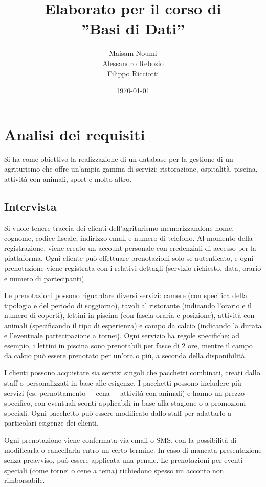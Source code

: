 \documentclass[a4paper,11pt]{report}
\title{Elaborato per il corso di\\''Basi di Dati''}
\author{
    Maisam Noumi\\
    Alessandro Rebosio\\
    Filippo Ricciotti
}
\date{\today}
\begin{document}
\maketitle

\tableofcontents

\chapter{Analisi dei requisiti}
Si ha come obiettivo la realizzazione di un database per la gestione di un agriturismo che offre un'ampia gamma di servizi: ristorazione,
ospitalità, piscina, attività con animali, sport e molto altro.

\section{Intervista}
Si vuole tenere traccia dei clienti dell'agriturismo memorizzandone nome, cognome, codice fiscale, indirizzo email e numero di telefono. Al
momento della registrazione, viene creato un account personale con credenziali di accesso per la piattaforma. Ogni cliente
può effettuare prenotazioni solo se autenticato, e ogni prenotazione viene registrata con i relativi dettagli (servizio richiesto, data,
orario e numero di partecipanti).

Le prenotazioni possono riguardare diversi servizi: camere (con specifica della tipologia e del periodo di soggiorno), tavoli al
ristorante (indicando l'orario e il numero di coperti), lettini in piscina (con fascia oraria e posizione), attività con animali
(specificando il tipo di esperienza) e campo da calcio (indicando la durata e l'eventuale partecipazione a tornei). Ogni servizio ha
regole specifiche: ad esempio, i lettini in piscina sono prenotabili per fasce di 2 ore, mentre il campo da calcio può essere prenotato
per un'ora o più, a seconda della disponibilità.

I clienti possono acquistare sia servizi singoli che pacchetti combinati, creati dallo staff o personalizzati in base alle esigenze. I pacchetti
possono includere più servizi (es. pernottamento + cena + attività con animali) e hanno un prezzo specifico, con eventuali sconti applicabili
in base alla stagione o a promozioni speciali. Ogni pacchetto può essere modificato dallo staff per adattarlo a particolari esigenze dei clienti.

Ogni prenotazione viene confermata via email o SMS, con la possibilità di modificarla o cancellarla entro un certo termine. In caso di
mancata presentazione senza preavviso, può essere applicata una penale. Le prenotazioni per eventi speciali (come tornei o cene a tema) richiedono
spesso un acconto non rimborsabile.
\end{document}

